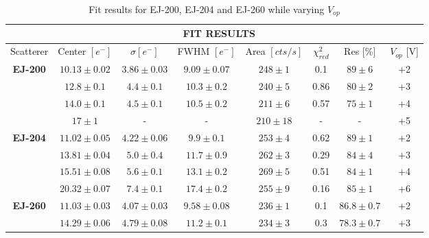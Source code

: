 \documentclass[10pt,a4paper, openany]{book}
\begin{document}
\begin{table}[!h]
\centering
\caption{Fit results for EJ-200, EJ-204 and EJ-260 while varying $V_{op}$}
\label{tab:fit}
{\small
\begin{tabular}{@{}cccccccc@{}}
\toprule
                                 & \multicolumn{6}{c}{\textbf{FIT RESULTS}}                                                              &                  \\ \midrule
Scatterer                        & Center $[e^-]$   & $\sigma [e^-]$  & FWHM $[e^-]$   & Area $[cts/s]$ & $\chi^2_{red}$ & Res {[}\%{]}  & $V_{op}$ [V] \\ \midrule
\multirow{4}{*}{\textbf{EJ-200}} & $10.13 \pm 0.02$ & $3.86 \pm 0.03$ & $9.09\pm 0.07$ & $248 \pm 1$    & 0.1            & $89\pm 6$     & +2               \\
                                 & $12.8 \pm 0.1$   & $4.4 \pm 0.1$   & $10.3\pm 0.2$  & $240 \pm 5$    & 0.86           & $80\pm 2$     & +3               \\
                                 & $14.0 \pm 0.1$   & $4.5 \pm 0.1$   & $10.5\pm 0.2$  & $211 \pm 6$    & 0.57           & $75\pm 1$     & +4               \\
                                 & $17 \pm 1$       & -               & -              & $210 \pm 18$   & -              & -             & +5               \\ \cmidrule(l){2-8} 
\multirow{4}{*}{\textbf{EJ-204}} & $11.02 \pm 0.05$ & $4.22\pm 0.06$  & $9.9\pm 0.1$   & $253\pm 4$     & 0.62           & $89\pm 1$     & +2               \\
                                 & $13.81\pm 0.04$  & $5.0 \pm 0.4$   & $11.7\pm 0.9$  & $262 \pm 3$    & 0.29           & $84\pm 4$     & +3               \\
                                 & $15.51\pm 0.08$  & $5.6\pm 0.1$    & $13.1\pm 0.2$  & $269\pm 5$     & 0.51           & $84\pm 1$     & +4               \\
                                 & $20.32\pm 0.07$  & $7.4 \pm 0.1$   & $17.4\pm 0.2$  & $255\pm 9$     & 0.16           & $85\pm 1$     & +6               \\ \cmidrule(l){2-8}
\multirow{2}{*}{\textbf{EJ-260}} & $11.03 \pm 0.03$ & $4.07\pm 0.03$  & $9.58\pm 0.08$ & $236\pm 1$     & 0.1            & $86.8\pm 0.7$ & +2               \\
                                 & $14.29\pm 0.06$  & $4.79\pm 0.08$  & $11.2\pm 0.1$  & $234\pm 3$     & 0.3            & $78.3\pm 0.7$ & +3       \\    
\bottomrule
\end{tabular}
}
\end{table}
\end{document}

